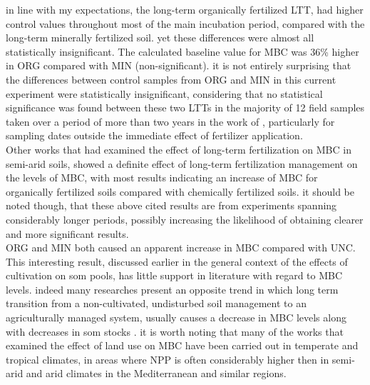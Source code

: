 \documentclass[12pt]{report}
\begin{document}
		in line with my expectations, the long-term organically fertilized LTT, had higher control values throughout most of the main incubation period, compared with the long-term minerally fertilized soil. yet these differences were almost all statistically insignificant. The calculated baseline value for MBC was 36\% higher in ORG compared with MIN (non-significant). it is not entirely surprising that the differences between control samples from ORG and MIN in this current experiment were statistically insignificant, considering that no statistical significance was found between these  two LTTs in the majority of 12 field samples taken over a period of more than two years in the work of \citet{rotbart2018}, particularly for sampling dates outside the immediate effect of fertilizer application.\\
		Other works that had examined the effect of long-term fertilization on MBC in semi-arid soils, showed a definite effect of long-term fertilization management on the levels of MBC, with most results indicating an increase of MBC for organically fertilized soils compared with chemically fertilized soils\citep{luo2015, liu2013, ghoshal1995}. it should be noted though, that these above cited results are from experiments spanning considerably longer periods, possibly increasing the likelihood of obtaining clearer and more significant results.\\
		ORG and MIN both caused an apparent increase in MBC compared with UNC. This interesting result, discussed earlier in the general context of the effects of cultivation on \gls{som} pools, has little support in literature with regard to MBC levels. indeed many researches present an opposite trend in which long term transition from a non-cultivated, undisturbed soil management to an agriculturally managed system, usually causes a decrease in MBC levels along with decreases in \gls{som} stocks \citep{benbi2015, yu2013,zhou2018}. it is worth noting that many of the works that examined the effect of land use on MBC have been carried out in temperate and tropical climates, in areas where NPP is often considerably higher then in semi-arid and arid climates in the Mediterranean and similar regions.\\
\end{document}
